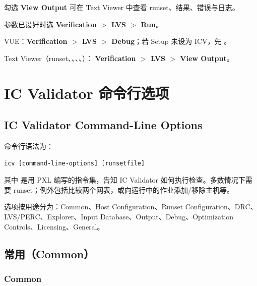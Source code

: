 \begin{noteBox}
勾选 \textbf{View Output} 可在 Text Viewer 中查看 runset、结果、错误与日志。
\end{noteBox}

参数已设好时选 \textbf{Verification $>$ LVS $>$ Run}。

VUE：\textbf{Verification $>$ LVS $>$ Debug}；若 Setup 未设为 ICV，先 。

Text Viewer（runset、、、、）：
\textbf{Verification $>$ LVS $>$ View Output}。

\section{IC Validator 命令行选项}
\subsection*{IC Validator Command-Line Options}

命令行语法为：
\begin{lstlisting}
icv [command-line-options] [runsetfile]
\end{lstlisting}

其中  是用 PXL 编写的指令集，告知 IC Validator 如何执行检查。多数情况下需要 runset；例外包括比较两个网表，或向运行中的作业添加/移除主机等。

选项按用途分为：Common、Host Configuration、Runset Configuration、DRC、LVS/PERC、Explorer、Input Database、Output、Debug、Optimization Controls、Licensing、General。

\subsection{常用（Common）}
\subsubsection*{Common}

